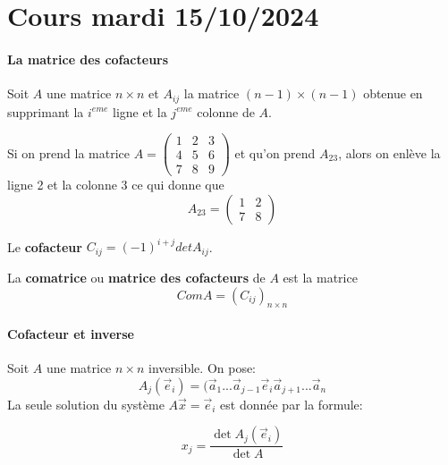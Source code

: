 \section{Cours mardi 15/10/2024 }



\paragraph{La matrice des cofacteurs} Soit $A$ une matrice $n \times n$ et $A_{ij}$ la matrice $(n-1) \times (n-1)$ obtenue en supprimant la $i^{eme}$ ligne et la $j^{eme}$ colonne de $A$.
\\
\begin{exemple}
    Si on prend la matrice $A = \begin{pmatrix}
        1 & 2 & 3 \\
        4 & 5 & 6 \\
        7 & 8 & 9
    \end{pmatrix}$ et qu'on prend $A_{23}$, alors on enlève la ligne 2 et la colonne 3 ce qui donne que 
    \[ A_{23} = \begin{pmatrix}
        1 & 2 \\
        7 & 8
    \end{pmatrix}\]
    \begin{definition}
        Le \textbf{cofacteur} $C_{ij} = (-1)^{i+j}det A_{ij}$.
    \end{definition}
\end{exemple}
\begin{definition}
    
    La \textbf{comatrice} ou \textbf{matrice des cofacteurs} de $A$ est la matrice
    \[ComA = (C_{ij})_{n\times n}\]
\end{definition}

\paragraph{Cofacteur et inverse}
Soit $A$ une matrice $n \times n$ inversible. On pose:
\[A_j(\vec{e}_i) = (\vec{a}_1 ... \vec{a}_{j-1} \vec{e}_i \vec{a}_{j+1} ... \vec{a}_n\]
La seule solution du système $A\vec{x} = \vec{e}_i$ est donnée par la formule:
\begin{definition}
    \begin{equation*}
        x_j = \frac{\det A_j(\vec{e}_i)}{\det A}
    \end{equation*}
\end{definition}


